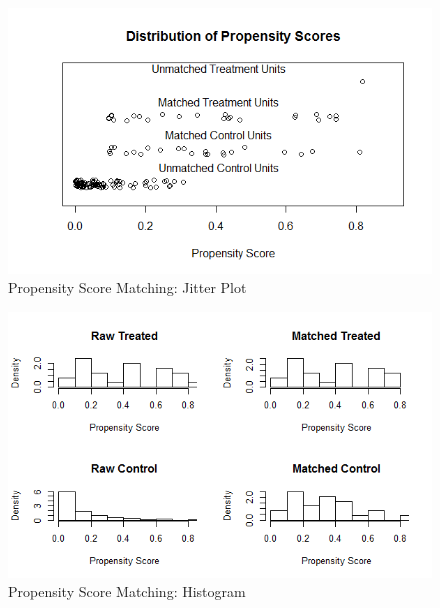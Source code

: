 \documentclass[12pt, a4paper]{article}
\begin{document}
\clearpage
\pagebreak
\begin{figure}[h]
    \centering
    \includegraphics{Jitter}
    \caption{Propensity Score Matching: Jitter Plot}
    \label{Fig1}
\end{figure}

\begin{figure}[h]
    \centering
    \includegraphics{PSMatch}
    \caption{Propensity Score Matching: Histogram}
    \label{Fig2}
\end{figure}
\end{document}
